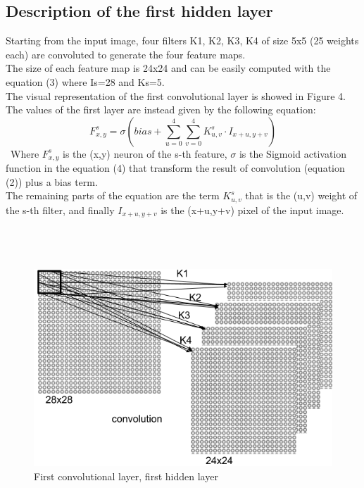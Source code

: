 \documentclass[a4paper]{report}
\begin{document}
\subsection{Description of the first hidden layer}
Starting from the input image, four filters K1, K2, K3, K4 of size 5x5 (25 weights each) are convoluted to generate the four feature maps.\\
The size of each feature map is 24x24 and can be easily computed with the equation (3) where Is=28 and Ks=5.\\
The visual representation of the first convolutional layer is showed in Figure 4.\\
The values of the first layer are instead given by the following equation:
\begin{equation} 
\label{convLayer}
F^{s}_{x,y} = \sigma (bias + \sum_{u=0}^{4}\sum_{v=0}^{4}K^{s}_{u,v} \cdot I_{x+u,y+v})
 \end{equation}
 \
Where \( F^{s}_{x,y} \) is the (x,y) neuron of the s-th feature, \( \sigma \) is the Sigmoid activation function in the equation (4) that transform the result of convolution (equation (2)) plus a bias term.\\
The remaining parts of the equation are the term \( K^{s}_{u,v} \) that is the (u,v) weight of the s-th filter, and finally \( I_{x+u,y+v} \) is the (x+u,y+v) pixel of the input image.\\\\\\\\
\begin{figure}[!h]
\centering
\includegraphics[scale=0.3]{docs/c1.png} 
\caption{First convolutional layer, first hidden layer}
\label{fig_c1}
\end{figure}
\end{document}
